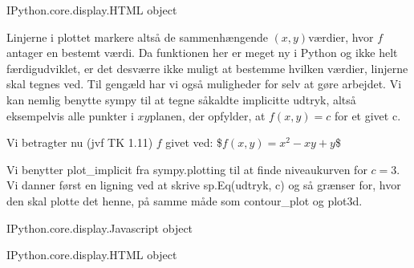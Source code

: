 \documentclass[letterpaper,10pt,english]{jupyterBook}
\begin{document}
\begin{sphinxVerbatim}[commandchars=\\\{\}]
\PYGZlt{}IPython.core.display.HTML object\PYGZgt{}
\end{sphinxVerbatim}

Linjerne i plottet markere altså de sammenhængende \((x,y)\)\sphinxhyphen{}værdier, hvor \(f\) antager en bestemt værdi. Da funktionen her er meget ny i Python og ikke helt færdigudviklet, er det desværre ikke muligt at bestemme hvilken værdier, linjerne skal tegnes ved. Til gengæld har vi også muligheder for selv at gøre arbejdet. Vi kan nemlig benytte sympy til at tegne såkaldte implicitte udtryk, altså eksempelvis alle punkter i \(xy\)\sphinxhyphen{}planen, der opfylder, at \(f(x,y) = c\) for et givet c.

Vi betragter nu (jvf TK 1.11) \(f\) givet ved:
\$\(f(x,y) = x^2 - xy + y\)\$

Vi benytter plot\_implicit fra sympy.plotting til at finde niveaukurven for \(c = 3\). Vi danner først en ligning ved at skrive sp.Eq(udtryk, c) og så grænser for, hvor den skal plotte det henne, på samme måde som contour\_plot og plot3d.

\begin{sphinxVerbatim}[commandchars=\\\{\}]
          

   
       
\end{sphinxVerbatim}

\begin{sphinxVerbatim}[commandchars=\\\{\}]
\PYGZlt{}IPython.core.display.Javascript object\PYGZgt{}
\end{sphinxVerbatim}

\begin{sphinxVerbatim}[commandchars=\\\{\}]
\PYGZlt{}IPython.core.display.HTML object\PYGZgt{}
\end{sphinxVerbatim}
\end{document}
